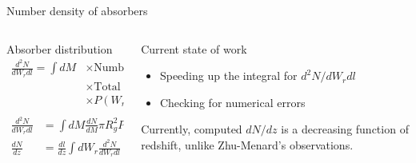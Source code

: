 \documentclass{beamer}
\begin{document}
		\begin{frame}{Number density of absorbers}
			\begin{columns}
				\begin{column}{0.6\textwidth}
					\begin{block}{Absorber distribution}
						\begin{equation}
						\begin{aligned}
						\frac{d^2N}{dW_rdl}=\int dM&\times\text{Number density of halos}\\
						&\times\text{Total cross section}\\
						&\times P(W_r|M)\\
						\end{aligned}
						\end{equation}
						$$
						\begin{aligned}
						\frac{d^2N}{dW_rdl}&=\int dM\frac{dN}{dM}\pi R_g^2P(W_r|M)\\
						\frac{dN}{dz}&=\frac{dl}{dz}\int dW_r\frac{d^2N}{dW_rdl}\\
						\end{aligned}
						$$
					\end{block}
				\end{column}
				\begin{column}{0.3\textwidth}
					\begin{block}{Current state of work}
						\begin{itemize}
							\item Speeding up the integral for $d^2N/dW_rdl$
							\item Checking for numerical errors
						\end{itemize}
						Currently, computed $dN/dz$ is a decreasing function of redshift, unlike Zhu-Menard's observations.
					\end{block}
				\end{column}
			\end{columns}
		\end{frame}
\end{document}
